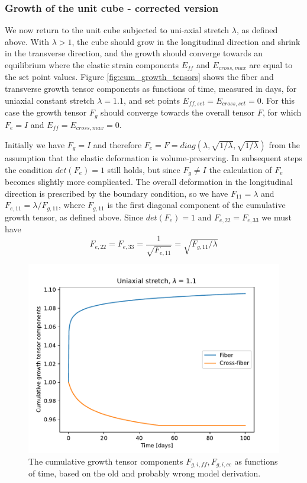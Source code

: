 \documentclass[a4paper,10pt]{article}
\begin{document}
\subsubsection{Growth of the unit cube - corrected version} 
We now return to the unit cube subjected to uni-axial stretch $\lambda$, as defined above. With $\lambda > 1$, the cube 
should grow in the longitudinal direction and shrink in the transverse direction, and the growth should converge towards
an equilibrium where the elastic strain components $E_{ff}$ and $E_{cross,max}$ are equal to the set point values.
Figure \ref{fig:cum_growth_tensors} shows the fiber and transverse growth tensor components as functions of time, 
measured in days, for uniaxial constant stretch $\lambda = 1.1$, and set points $E_{ff, set} = E_{cross,set} = 0$. 
For this case the growth tensor $F_g$ should converge towards the overall tensor $F$, for which $F_e = I$ and 
$E_{ff} = E_{cross,max} = 0$. 

Initially we have $F_g = I$ and therefore $F_e = F = diag(\lambda, \sqrt{1/\lambda}, \sqrt{1/\lambda})$ from 
the assumption that the elastic deformation is volume-preserving. In subsequent steps the condition
$det(F_e) = 1$ still holds, but since $F_g \neq I$ the calculation of $F_e$ becomes slightly more complicated.
The overall deformation in the longitudinal direction is prescribed by the boundary condition, so we have
$F_{11} = \lambda$ and $F_{e,11} = \lambda / F_{g,11}$, where $F_{g,11}$ is the first diagonal component of the 
cumulative growth tensor, as defined above. Since $det(F_e) = 1$ and $F_{e,22} = F_{e,33}$ we must have
\[
F_{e,22} = F_{e,33} = \frac{1}{\sqrt{F_{e,11}}} = \sqrt{F_{g,11}/ \lambda}
\]

\begin{figure}
  \centerline{
    \includegraphics{figs/cumulative_growth_old}
  }
\caption{The cumulative growth tensor components $F_{g,i,ff}, F_{g,i,cc}$ as functions of time, based on
the old and probably wrong model derivation.}
\label{fig:cum_growth_tensors_old}
\end{figure}
\end{document}
